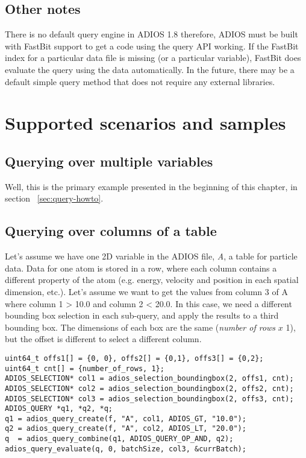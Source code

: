 \subsection{Other notes}
There is no default query engine in ADIOS 1.8 therefore, ADIOS must be built with FastBit support to get a code using the query API working. If the FastBit index for a particular data file is missing (or a particular variable), FastBit does evaluate the query using the data automatically. In the future, there may be a default simple query method that does not require any external libraries.


%
%
\section{Supported scenarios and samples}


\subsection{Querying over multiple variables}
Well, this is the primary example presented in the beginning of this chapter, in section ~\ref{sec:query-howto}.

\subsection{Querying over columns of a table}
\label{sec:query-example-columns}
Let's assume we have one 2D variable in the ADIOS file, \emph{A}, a table for particle data. Data for one atom is stored in a row, where each column contains a different property of the atom (e.g. energy, velocity and position in each spatial dimension, etc.).
Let's assume we want to get the values from column 3 of A where column 1 > 10.0 and  column 2 < 20.0.
In this case, we need a different bounding box selection in each sub-query, and apply the results to a third bounding box. The dimensions of each box are the same (\emph{number of rows} $x$ 1), but the offset is different to select a different column.

\begin{lstlisting}[alsolanguage=C,
                             caption={Query over the columns of a table}, label=code:query_columns]
uint64_t offs1[] = {0, 0}, offs2[] = {0,1}, offs3[] = {0,2};
uint64_t cnt[] = {number_of_rows, 1};  
ADIOS_SELECTION* col1 = adios_selection_boundingbox(2, offs1, cnt);
ADIOS_SELECTION* col2 = adios_selection_boundingbox(2, offs2, cnt);
ADIOS_SELECTION* col3 = adios_selection_boundingbox(2, offs3, cnt);
ADIOS_QUERY *q1, *q2, *q;
q1 = adios_query_create(f, "A", col1, ADIOS_GT, "10.0");
q2 = adios_query_create(f, "A", col2, ADIOS_LT, "20.0");
q  = adios_query_combine(q1, ADIOS_QUERY_OP_AND, q2);
adios_query_evaluate(q, 0, batchSize, col3, &currBatch);

\end{lstlisting}


